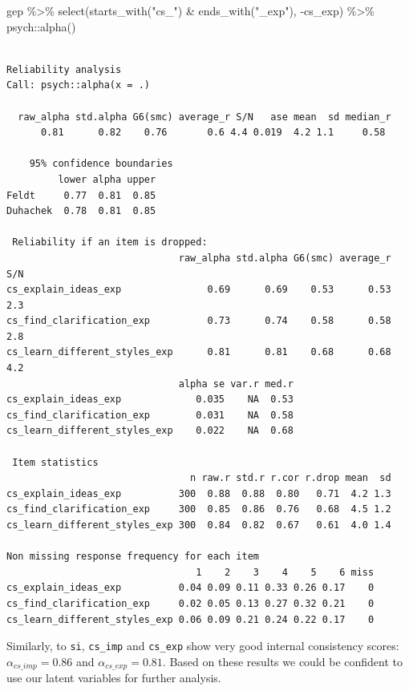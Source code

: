 \documentclass[
  letterpaper,
]{krantz}
\makeatletter
\newenvironment{Shaded}{\begin{snugshade}}{\end{snugshade}}
\newcommand{\FunctionTok}[1]{\textcolor[rgb]{0.28,0.35,0.67}{#1}}
\newcommand{\NormalTok}[1]{\textcolor[rgb]{0.00,0.23,0.31}{#1}}
\newcommand{\SpecialCharTok}[1]{\textcolor[rgb]{0.37,0.37,0.37}{#1}}
\newcommand{\StringTok}[1]{\textcolor[rgb]{0.13,0.47,0.30}{#1}}
\newenvironment{kframe}{%
\medskip{}
\setlength{\fboxsep}{.8em}
 \def\at@end@of@kframe{}%
 \ifinner\ifhmode%
  \def\at@end@of@kframe{\end{minipage}}%
  \begin{minipage}{\columnwidth}%
 \fi\fi%
 \def\FrameCommand##1{\hskip\@totalleftmargin \hskip-\fboxsep
 \colorbox{shadecolor}{##1}\hskip-\fboxsep
     \hskip-\linewidth \hskip-\@totalleftmargin \hskip\columnwidth}%
 \MakeFramed {\advance\hsize-\width
   \@totalleftmargin\z@ \linewidth\hsize
   \@setminipage}}%
 {\par\unskip\endMakeFramed%
 \at@end@of@kframe}
\renewenvironment{Shaded}{\begin{kframe}}{\end{kframe}}
\makeatother
\begin{document}
\begin{Shaded}
\begin{Highlighting}[]
\NormalTok{gep }\SpecialCharTok{\%\textgreater{}\%}
  \FunctionTok{select}\NormalTok{(}\FunctionTok{starts\_with}\NormalTok{(}\StringTok{"cs\_"}\NormalTok{) }\SpecialCharTok{\&} \FunctionTok{ends\_with}\NormalTok{(}\StringTok{"\_exp"}\NormalTok{), }\SpecialCharTok{{-}}\NormalTok{cs\_exp) }\SpecialCharTok{\%\textgreater{}\%}
\NormalTok{  psych}\SpecialCharTok{::}\FunctionTok{alpha}\NormalTok{()}
\end{Highlighting}
\end{Shaded}

\begin{verbatim}

Reliability analysis   
Call: psych::alpha(x = .)

  raw_alpha std.alpha G6(smc) average_r S/N   ase mean  sd median_r
      0.81      0.82    0.76       0.6 4.4 0.019  4.2 1.1     0.58

    95% confidence boundaries 
         lower alpha upper
Feldt     0.77  0.81  0.85
Duhachek  0.78  0.81  0.85

 Reliability if an item is dropped:
                              raw_alpha std.alpha G6(smc) average_r S/N
cs_explain_ideas_exp               0.69      0.69    0.53      0.53 2.3
cs_find_clarification_exp          0.73      0.74    0.58      0.58 2.8
cs_learn_different_styles_exp      0.81      0.81    0.68      0.68 4.2
                              alpha se var.r med.r
cs_explain_ideas_exp             0.035    NA  0.53
cs_find_clarification_exp        0.031    NA  0.58
cs_learn_different_styles_exp    0.022    NA  0.68

 Item statistics 
                                n raw.r std.r r.cor r.drop mean  sd
cs_explain_ideas_exp          300  0.88  0.88  0.80   0.71  4.2 1.3
cs_find_clarification_exp     300  0.85  0.86  0.76   0.68  4.5 1.2
cs_learn_different_styles_exp 300  0.84  0.82  0.67   0.61  4.0 1.4

Non missing response frequency for each item
                                 1    2    3    4    5    6 miss
cs_explain_ideas_exp          0.04 0.09 0.11 0.33 0.26 0.17    0
cs_find_clarification_exp     0.02 0.05 0.13 0.27 0.32 0.21    0
cs_learn_different_styles_exp 0.06 0.09 0.21 0.24 0.22 0.17    0
\end{verbatim}

Similarly, to \texttt{si}, \texttt{cs\_imp} and \texttt{cs\_exp} show
very good internal consistency scores: \(\alpha_{cs\_imp} = 0.86\) and
\(\alpha_{cs\_exp} = 0.81\). Based on these results we could be
confident to use our latent variables for further analysis.
\end{document}
